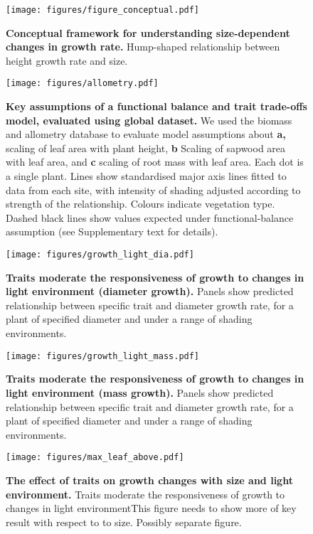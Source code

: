\documentclass[12pt, a4paper]{article}
\makeatletter
\def\maxwidth{\ifdim\Gin@nat@width>\linewidth\linewidth
\else\Gin@nat@width\fi}
\let\Oldincludegraphics\includegraphics
\renewcommand{\includegraphics}[1]{\Oldincludegraphics[width=\maxwidth]{#1}}
\makeatother
\begin{document}
\newpage

\begin{figure}[ht]
\centering
\texttt{[image: figures/figure\_conceptual.pdf]}
\caption{\textbf{Conceptual framework for understanding size-dependent
changes in growth rate.} Hump-shaped relationship between height growth rate and
size. \label{f-conceptual}}
\end{figure}

\newpage

\begin{figure}[ht]
\centering
\texttt{[image: figures/allometry.pdf]}
\caption{\textbf{Key assumptions of a functional balance and trait
trade-offs model, evaluated using global dataset.} We used the biomass and
allometry database to evaluate model assumptions about \textbf{a,}
scaling of leaf area with plant height, \textbf{b} Scaling of sapwood
area with leaf area, and \textbf{c} scaling of root mass with leaf area.
Each dot is a single plant. Lines show standardised major axis lines
fitted to data from each site, with intensity of shading adjusted
according to strength of the relationship. Colours indicate vegetation
type. Dashed black lines show values expected under functional-balance
assumption (see Supplementary text for details). \label{f-assumptions}}
\end{figure}

\newpage

\begin{figure}[ht]
\centering
\texttt{[image: figures/growth\_light\_dia.pdf]}
\caption{\textbf{Traits moderate the responsiveness of growth to changes
in light environment (diameter growth).} Panels show predicted relationship between
specific trait and diameter growth rate, for a plant of specified
diameter and under a range of shading environments.
\label{f-growth_light_dia}}
\end{figure}

\begin{figure}[ht]
\centering
\texttt{[image: figures/growth\_light\_mass.pdf]}
\caption{\textbf{Traits moderate the responsiveness of growth to changes
in light environment (mass growth).} Panels show predicted relationship between
specific trait and diameter growth rate, for a plant of specified
diameter and under a range of shading environments.
\label{f-growth_light_mass}}
\end{figure}

\newpage

\begin{figure}[ht]
\centering
\texttt{[image: figures/max\_leaf\_above.pdf]}
\caption{\textbf{The effect of traits on growth changes with size and
light environment.} Traits moderate the responsiveness of growth to changes in light
environmentThis figure needs to show more of key result with respect to to size.
Possibly separate figure. \label{f-shifts}}
\end{figure}
\end{document}
